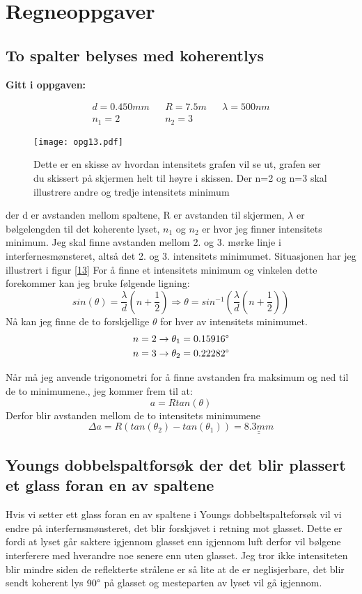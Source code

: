 \documentclass[a4paper,12pt,norsk]{article}
\newcommand{\uu}{\underline}
\begin{document}
\section{Regneoppgaver}
\subsection{To spalter belyses med koherentlys}
\begin{center}
\textbf{Gitt i oppgaven:}
\end{center}
\begin{align*}
d = 0.450mm && R = 7.5m && \lambda = 500nm\\
n_1 = 2 && n_2 = 3
\end{align*}

\begin{figure}
\texttt{[image: opg13.pdf]}\\
\caption[Intensitetminimum]{Dette er en skisse av hvordan intensitets grafen vil se ut, grafen ser du skissert på skjermen helt til høyre i skissen. Der n=2 og n=3 skal illustrere andre og tredje intensitets minimum}
\label{13}
\end{figure}

der d er avstanden mellom spaltene, R er avstanden til skjermen, $\lambda$ er bølgelengden til det koherente lyset, $n_1$ og $n_2$ er hvor jeg finner intensitets minimum.
Jeg skal finne avstanden mellom 2. og 3. mørke linje i interfernesmønsteret, altså det 2. og 3. intensitets minimumet. Situasjonen har jeg illustrert i figur \vref{13}
For å finne et intensitets minimum og vinkelen dette forekommer kan jeg bruke følgende ligning:
$$
sin(\theta) = \frac{\lambda}{d}\left(n+\frac{1}{2} \right) 
\Rightarrow \theta = sin^{-1}\left(\frac{\lambda}{d}\left(n+\frac{1}{2} \right)\right) 
$$
Nå kan jeg finne de to forskjellige $\theta$ for hver av intensitets minimumet. 
\begin{align*}
n = 2\rightarrow \theta_1 = 0.15916\degree\\
n = 3 \rightarrow \theta_2 = 0.22282\degree
\end{align*}

Når må jeg anvende trigonometri for å finne avstanden fra maksimum og ned til de to minimumene., jeg kommer frem til at:
$$
a = Rtan(\theta)
$$
Derfor blir avstanden mellom de to intensitets minimumene
$$
\Delta a = R(tan(\theta_2)-tan(\theta_1)) =\uu{\uu{ 8.3 mm}}
$$

\subsection{Youngs dobbelspaltforsøk der det blir plassert et glass foran en av spaltene}
Hvis vi setter ett glass foran en av spaltene i Youngs dobbeltspalteforsøk vil vi endre på interfernsmønsteret, det blir forskjøvet i retning mot glasset. Dette er fordi at lyset går saktere igjennom glasset enn igjennom luft derfor vil bølgene interferere med hverandre noe senere enn uten glasset. Jeg tror ikke intensiteten blir mindre siden de reflekterte strålene er så lite at de er neglisjerbare, det blir sendt koherent lys $90\degree$ på glasset og mesteparten av lyset vil gå igjennom. 
\end{document}
